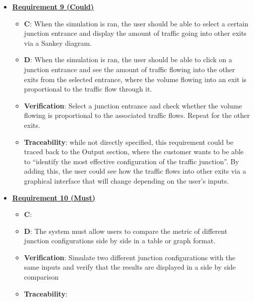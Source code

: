 \documentclass{article}
\begin{document}
\begin{itemize}
    \item \textbf{\underline{Requirement 9 (Could)}}
    \begin{itemize}
        \item \textbf{C}: When the simulation is ran, the user should be able to select a certain junction entrance 
            and display the amount of traffic going into other exits via a 
            Sankey diagram.
        \item \textbf{D}: When the simulation is ran, the user should be able to click on a junction entrance and see 
            the amount of traffic flowing into the other exits from the selected entrance, where the volume 
            flowing into an exit is proportional to the traffic flow through it.
        \item \textbf{Verification}: Select a junction entrance and check whether the volume flowing
            is proportional to the associated traffic flows. Repeat for the other exits.
        \item\textbf{Traceability}: while not directly specified, this requirement could be traced back 
            to the Output section, where the customer wants to be able to “identify the most effective 
            configuration of the traffic junction”. By adding this, the user could see how the traffic 
            flows into other exits via a graphical interface that will change depending on the user's 
            inputs.
    \end{itemize}

    \item \textbf{\underline{Requirement 10 (Must)}}
    \begin{itemize}
        \item \textbf{C}: 
        \item \textbf{D}: The system must allow users to compare the metric of different junction 
            configurations side by side in a table or graph format.
        \item \textbf{Verification}: Simulate two different junction configurations with the same 
            inputs and verify that the results are displayed in a side by side comparison
        \item\textbf{Traceability}: 
    \end{itemize}


\end{itemize}
\end{document}
